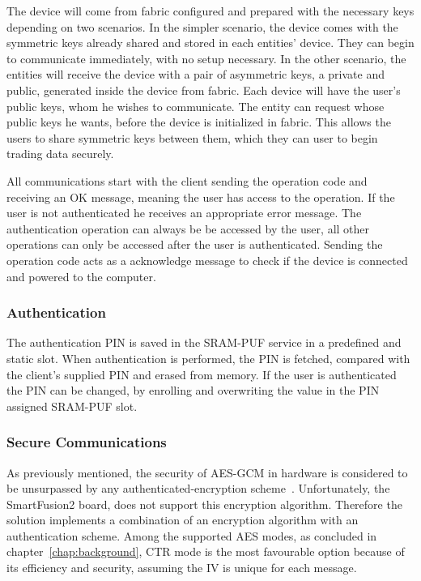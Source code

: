 The device will come from fabric configured and prepared with the necessary keys depending on two scenarios. In the simpler scenario, the device comes with the symmetric keys already shared and stored in each entities' device. They can begin to communicate immediately, with no setup necessary.
In the other scenario, the entities will receive the device with a pair of asymmetric keys, a private and public, generated inside the device from fabric. Each device will have the user's public keys, whom he wishes to communicate. The entity can request whose public keys he wants, before the device is initialized in fabric. This allows the users to share symmetric keys between them, which they can user to begin trading data securely.

All communications start with the client sending the operation code and receiving an OK message, meaning the user has access to the operation. If the user is not authenticated he receives an appropriate error message.
The authentication operation can always be be accessed by the user, all other operations can only be accessed after the user is authenticated.
Sending the operation code acts as a acknowledge message to check if the device is connected and powered to the computer.

\subsubsection*{Authentication}

The authentication PIN is saved in the SRAM-PUF service in a predefined and static slot. When authentication is performed, the PIN is fetched, compared with the client's supplied PIN and erased from memory.
If the user is authenticated the PIN can be changed, by enrolling and overwriting the value in the PIN assigned SRAM-PUF slot.

\subsubsection*{Secure Communications}

As previously mentioned, the security of \ac{AES}-\ac{GCM} in hardware is considered to be unsurpassed by any authenticated-encryption scheme~\cite{aesmodes}.
Unfortunately, the SmartFusion2 board, does not support this encryption algorithm.
Therefore the solution implements a combination of an encryption algorithm with an authentication scheme. Among the supported \ac{AES} modes, as concluded in chapter~\ref{chap:background}, CTR mode is the most favourable option because of its efficiency and security, assuming the IV is unique for each message.

